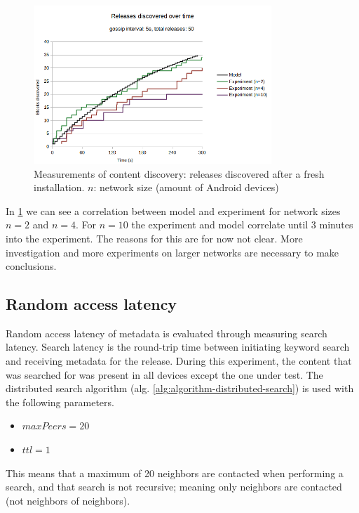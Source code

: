 \begin{figure}
    \centering
    \includegraphics[width=0.8\textwidth]{evaluation/expected-vs-simulated-releases.png}
    \caption{Measurements of content discovery: releases discovered after a fresh installation. $n$: network size (amount of Android devices)}
    \label{fig:content-discovery}
\end{figure}

In \ref{fig:content-discovery} we can see a correlation between model and experiment for network sizes $n=2$ and $n=4$. For $n=10$ the experiment and model correlate until 3 minutes into the experiment. The reasons for this are for now not clear. More investigation and more experiments on larger networks are necessary to make conclusions.

\subsection{Random access latency}
Random access latency of metadata is evaluated through measuring search latency. Search latency is the round-trip time between initiating keyword search and receiving metadata for the release. During this experiment, the content that was searched for was present in all devices except the one under test. The distributed search algorithm (alg. \ref{alg:algorithm-distributed-search}) is used with the following parameters.

\begin{itemize}
    \item $maxPeers=20$
    \item $ttl=1$ 
\end{itemize}

This means that a maximum of 20 neighbors are contacted when performing a search, and that search is not recursive; meaning only neighbors are contacted (not neighbors of neighbors).

